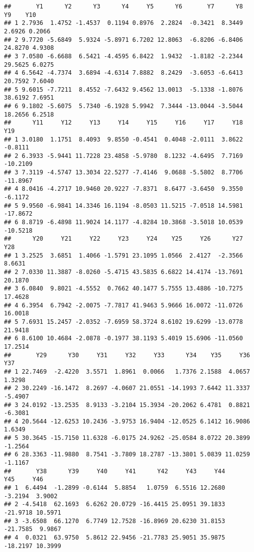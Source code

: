 \documentclass[
]{article}
\begin{document}
\begin{verbatim}
##       Y1      Y2      Y3      Y4     Y5      Y6       Y7      Y8      Y9    Y10
## 1 2.7936  1.4752 -1.4537  0.1194 0.8976  2.2824  -0.3421  8.3449  2.6926 0.2066
## 2 9.7720 -5.6849  5.9324 -5.8971 6.7202 12.8063  -6.8206 -6.8406 24.8270 4.9308
## 3 7.0580 -6.6688  6.5421 -4.4595 6.8422  1.9432  -1.8182 -2.2344 29.5625 6.0275
## 4 6.5642 -4.7374  3.6894 -4.6314 7.8882  8.2429  -3.6053 -6.6413 20.7592 7.6040
## 5 9.6015 -7.7211  8.4552 -7.6432 9.4562 13.0013  -5.1338 -1.8076 38.6192 7.6951
## 6 9.1802 -5.6075  5.7340 -6.1928 5.9942  7.3444 -13.0044 -3.5044 18.2656 6.2518
##      Y11     Y12     Y13     Y14     Y15     Y16     Y17     Y18      Y19
## 1 3.0180  1.1751  8.4093  9.8550 -0.4541  0.4048 -2.0111  3.8622  -0.8111
## 2 6.3933 -5.9441 11.7228 23.4858 -5.9780  8.1232 -4.6495  7.7169 -10.2109
## 3 7.3119 -4.5747 13.3034 22.5277 -7.4146  9.0688 -5.5802  8.7706 -11.8967
## 4 8.0416 -4.2717 10.9460 20.9227 -7.8371  8.6477 -3.6450  9.3550  -6.1172
## 5 9.9560 -6.9841 14.3346 16.1194 -8.0503 11.5215 -7.0518 14.5981 -17.8672
## 6 8.8719 -6.4898 11.9024 14.1177 -4.8284 10.3868 -3.5018 10.0539 -10.5218
##      Y20     Y21     Y22     Y23     Y24    Y25     Y26      Y27     Y28
## 1 3.2525  3.6851  1.4066 -1.5791 23.1095 1.0566  2.4127  -2.3566  8.6631
## 2 7.0330 11.3887 -8.0260 -5.4715 43.5835 6.6822 14.4174 -13.7691 20.1870
## 3 6.0840  9.8021 -4.5552  0.7662 40.1477 5.7555 13.4886 -10.7275 17.4628
## 4 6.3954  6.7942 -2.0075 -7.7817 41.9463 5.9666 16.0072 -11.0726 16.0018
## 5 7.6931 15.2457 -2.0352 -7.6959 58.3724 8.6102 19.6299 -13.0778 21.9418
## 6 8.6100 10.4684 -2.0878 -0.1977 38.1193 5.4019 15.6906 -11.0560 17.2514
##       Y29      Y30     Y31     Y32     Y33      Y34    Y35     Y36     Y37
## 1 22.7469  -2.4220  3.5571  1.8961  0.0066   1.7376 2.1588  4.0657  1.3298
## 2 30.2249 -16.1472  8.2697 -4.0607 21.0551 -14.1993 7.6442 11.3337 -5.4907
## 3 24.0192 -13.2535  8.9133 -3.2104 15.3934 -20.2062 6.4781  0.8821 -6.3081
## 4 20.5644 -12.6253 10.2436 -3.9753 16.9404 -12.0525 6.1412 16.9086  1.6349
## 5 30.3645 -15.7150 11.6328 -6.0175 24.9262 -25.0584 8.0722 20.3899 -1.2564
## 6 28.3363 -11.9880  8.7541 -3.7809 18.2787 -13.3801 5.0839 11.0259 -1.1167
##       Y38      Y39     Y40     Y41      Y42     Y43     Y44      Y45     Y46
## 1  6.4494  -1.2899 -0.6144  5.8854   1.0759  6.5516 12.2680  -3.2194  3.9002
## 2 -4.5418  62.1693  6.6262 20.0729 -16.4415 25.0951 39.1833 -21.9718 10.5971
## 3 -3.6508  66.1270  6.7749 12.7528 -16.8969 20.6230 31.8153 -21.7585  9.9867
## 4  0.0321  63.9750  5.8612 22.9456 -21.7783 25.9051 35.9875 -18.2197 10.3999

\end{verbatim}
\end{document}
